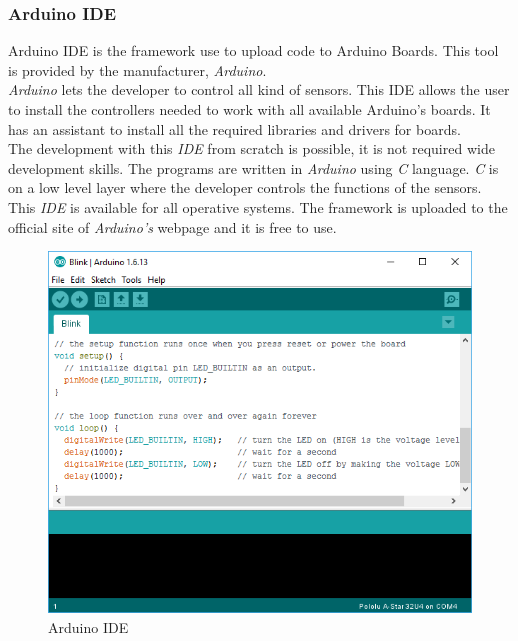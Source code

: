 \subsubsection{Arduino IDE}

Arduino IDE is the framework use to upload code to Arduino Boards. This tool is provided by the manufacturer, \textit{Arduino}.\\

\textit{Arduino} lets the developer to control all kind of sensors. This IDE allows the user to install the controllers needed to work with all available Arduino's boards. It has an assistant to install all the required libraries and drivers for boards.\\

The development with this \textit{IDE} from scratch is possible, it is not required wide development skills. The programs are written in \textit{Arduino} using \textit{C} language. \textit{C} is on a low level layer where the developer controls the functions of the sensors.\\

This \textit{IDE} is available for all operative systems. The framework is uploaded to the official site of  \textit{Arduino's} webpage and it is free to use.\\

\begin{figure}[H]
\begin{centering}
\includegraphics[scale=0.7]{IMGS/ARDUINO_IDE.png}
\caption{Arduino IDE \label{ARDUINO_IDE}}
\end{centering}
\end{figure}

